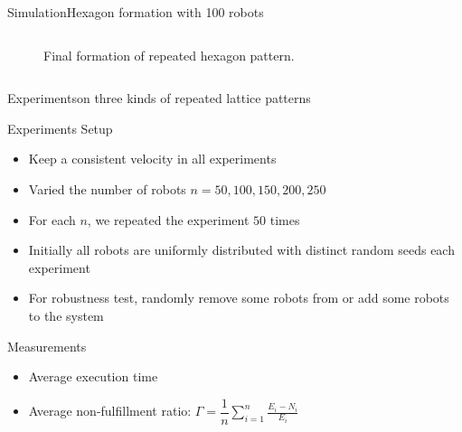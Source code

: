 \documentclass[10pt]{beamer}
\begin{document}
\begin{frame}{Simulation}{Hexagon formation with 100 robots}
\begin{block}{}
\begin{columns}[T]
\begin{column}{.5\textwidth}
\begin{figure}
            \caption{Final formation of repeated hexagon pattern.}
        \end{figure}
      \end{column}%
    \end{columns}
  \end{block}
\end{frame}

\begin{frame}{Experiments}{on three kinds of repeated
lattice patterns}
  \begin{block}{Experiments Setup}
    \begin{itemize}
    \item Keep a consistent velocity in all experiments
    \item Varied the number of robots $n=50, 100, 150, 200, 250$
    \item For each $n$, we repeated the experiment $50$ times
    \item Initially all robots are uniformly distributed with distinct
      random seeds each experiment
    \item For robustness test, randomly remove some robots from or add
      some robots to the system
    \end{itemize}
  \end{block}
  \begin{block}{Measurements}
    \begin{itemize}
    \item Average execution time
    \item Average non-fulfillment ratio: $\Gamma =
      \dfrac{1}{n}\sum\limits_{i=1}^n \frac{E_i - N_i}{E_i}$
    \end{itemize}
  \end{block}
\end{frame}
\end{document}
